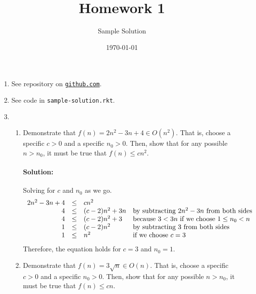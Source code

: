 \documentclass{article}
\title{Homework 1}
\author{Sample Solution}
\date{\today}
\begin{document}
\maketitle

\newcommand\link[2][http://]{\href{#1#2}{\nolinkurl{#2}}}
\newcommand\http[1]{\link[http://]{#1}}
\newcommand\https[1]{\link[https://]{#1}}
\newcommand\email[1]{\link[mailto:]{#1}}

\begin{enumerate}

\pagebreak[1]
\item See repository on \link{github.com}.

\pagebreak[1]
\item See code in \texttt{sample-solution.rkt}.

\pagebreak[1]
\item

  \begin{enumerate}

  \item Demonstrate that
    \(f(n) = 2n^2 - 3n + 4 \in O(n^2)\).
    That is, choose a specific \(c>0\) and a specific \(n_0 > 0\).
    Then, show that for any possible \(n > n_0\), it must be true that
    \(f(n) \leq c n^2\).

    \paragraph{Solution:} Solving for \(c\) and \(n_0\) as we go.
    \[
    \begin{array}{rcll}
      2n^2 - 3n + 4 &\leq& cn^2 \\
      4 &\leq& (c-2)n^2 + 3n
      & $by subtracting $ 2n^2 - 3n $ from both sides$ \\
      4 &\leq& (c-2)n^2 + 3
      & $because $ 3 < 3n $ if we choose $ 1 \leq n_0 < n \\
      1 &\leq& (c-2)n^2
      & $by subtracting $ 3 $ from both sides$ \\
      1 &\leq& n^2
      & $if we choose $ c = 3 \\
    \end{array}
    \]
    Therefore, the equation holds for \(c=3\) and \(n_0=1\).

  \item Demonstrate that
    \(f(n) = 3 \sqrt{n} \in O(n)\).
    That is, choose a specific \(c>0\) and a specific \(n_0 > 0\).
    Then, show that for any possible \(n > n_0\), it must be true that
    \(f(n) \leq c n\).


\end{enumerate}
\end{enumerate}
\end{document}
